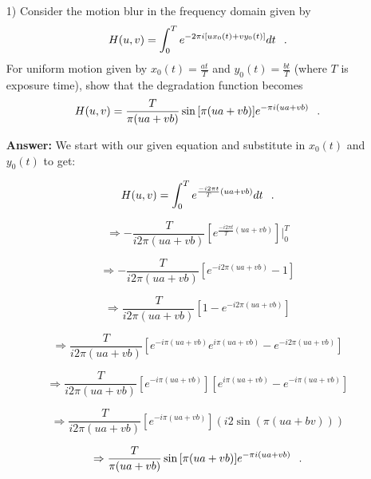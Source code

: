 \documentclass{article}
\begin{document}
\begin{enumerate}
\item[1)] Consider the motion blur in the frequency domain given by 
$$H(u,v)=\int_{0}^Te^{-2\pi i[ux_0(t)+vy_0(t)]}dt \hspace{0.1in}.$$ 
For uniform motion given by $x_0(t)=\frac{at}{T}$ and $y_0(t)=\frac{bt}{T}$ (where $T$ is exposure time), show that the degradation function becomes 
$$H(u,v)=\frac{T}{\pi(ua+vb)}\sin{[\pi(ua+vb)]}e^{-\pi i(ua+vb)} \hspace{0.1in}.$$

\textbf{Answer: }We start with our given equation and substitute in $x_0(t)$ and $y_0(t)$ to get:

\begin{equation}
H(u,v) = \int_{0}^{T} e^{\frac{-i2\pi t}{T}  (ua + vb) } dt \hspace{0.1in} .
\end{equation}

\begin{equation}
\Rightarrow - \frac{T}{i2\pi (ua + vb)} \left[ e^{\frac{-i2\pi t}{T}  (ua + vb)} \right] \Big|_0^T
\end{equation}

\begin{equation}
\Rightarrow - \frac{T}{i2\pi (ua + vb)} \left[ e^{-i2\pi (ua + vb)} - 1 \right]
\end{equation}

\begin{equation}
\Rightarrow \frac{T}{i2\pi (ua + vb)} \left[ 1 - e^{-i2\pi (ua + vb)} \right]
\end{equation}

\begin{equation}
\Rightarrow \frac{T}{i2\pi (ua + vb)} \left[ e^{-i\pi(ua + vb)}e^{i\pi(ua + vb)} - e^{-i2\pi (ua+vb)} \right]
\end{equation}

\begin{equation}
\Rightarrow \frac{T}{i2\pi (ua + vb)} \left[ e^{-i\pi (ua + vb)} \right] \left[ e^{i\pi(ua + vb)} - e^{-i\pi(ua + vb)} \right]
\end{equation}

\begin{equation}
\Rightarrow \frac{T}{i2\pi (ua + vb)} \left[ e^{-i\pi (ua + vb)} \right] (i2 \sin(\pi (ua + bv)))
\end{equation}

\begin{equation}
\Rightarrow \frac{T}{\pi(ua+vb)}\sin{[\pi(ua+vb)]}e^{-\pi i(ua+vb)} \hspace{0.1in} .
\end{equation}


\end{enumerate}
\end{document}
